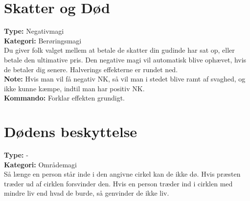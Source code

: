 \section{Skatter og Død}
\textbf{Type:} Negativmagi\\ 
\textbf{Kategori:} Berøringsmagi\\
Du giver folk valget mellem at betale de skatter din gudinde har sat op, eller betale den ultimative pris. Den negative magi vil automatisk blive ophævet, hvis de betaler dig senere. Halverings effekterne er rundet ned.\\
\textbf{Note:} Hvis man vil få negativ NK, så vil man i stedet blive ramt af svaghed, og ikke kunne kæmpe, indtil man har positiv NK.\\
\textbf{Kommando:} Forklar effekten grundigt.

\section{Dødens beskyttelse}
\textbf{Type:} - \\
\textbf{Kategori:} Områdemagi\\
Så længe en person står inde i den angivne cirkel kan de ikke dø. Hvis præsten træder ud af cirklen forsvinder den. Hvis en person træder ind i cirklen med mindre liv end hvad de burde, så genvinder de ikke liv.

